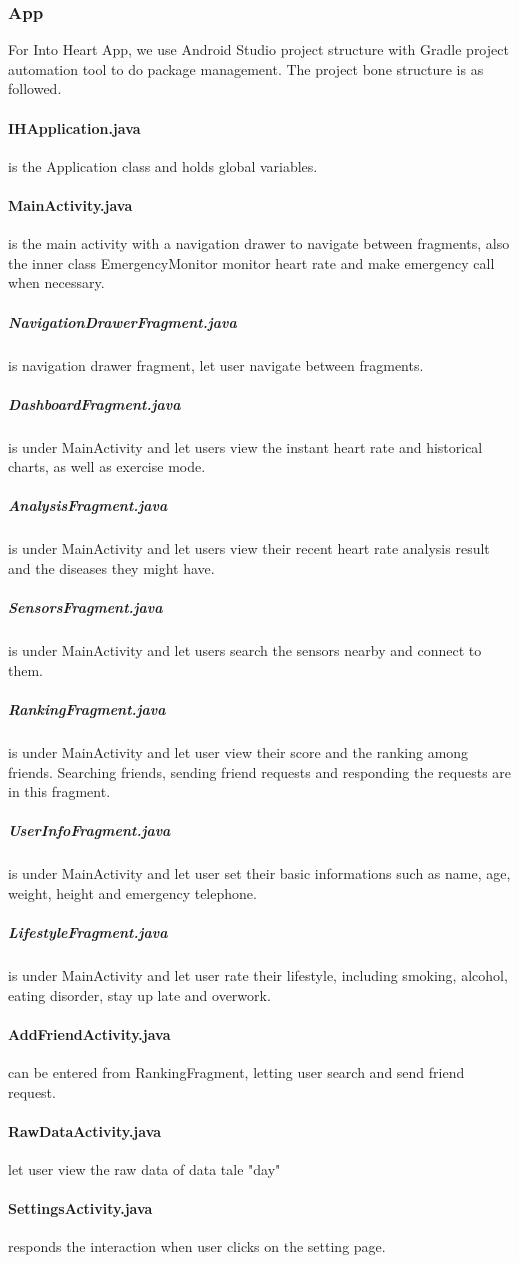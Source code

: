 \subsubsection{App}
For Into Heart App, we use Android Studio project structure with Gradle project automation tool to do package management. The project bone structure is as followed.

\paragraph{IHApplication.java} is the Application class and holds global variables.
\paragraph{MainActivity.java} is the main activity with a navigation drawer to navigate between fragments, also the inner class EmergencyMonitor monitor heart rate and make emergency call when necessary.
\subparagraph{NavigationDrawerFragment.java} is navigation drawer fragment, let user navigate between fragments.
\subparagraph{DashboardFragment.java} is under MainActivity and let users view the instant heart rate and historical charts, as well as exercise mode.
\subparagraph{AnalysisFragment.java} is under MainActivity and let users view their recent heart rate analysis result  and the diseases they might have.
\subparagraph{SensorsFragment.java} is under MainActivity and let users search the sensors nearby and connect to them.
\subparagraph{RankingFragment.java} is under MainActivity and let user view their score and the ranking among friends. Searching friends, sending friend requests and responding the requests are in this fragment.
\subparagraph{UserInfoFragment.java} is under MainActivity and let user set their basic informations such as name, age, weight, height and emergency telephone.
\subparagraph{LifestyleFragment.java} is under MainActivity and let user rate their lifestyle, including smoking, alcohol, eating disorder, stay up late and overwork.
\paragraph{AddFriendActivity.java} can be entered from RankingFragment, letting user search and send friend request.
\paragraph{RawDataActivity.java} let user view the raw data of data tale "day"
\paragraph{SettingsActivity.java} responds the interaction when user clicks on the setting page.

